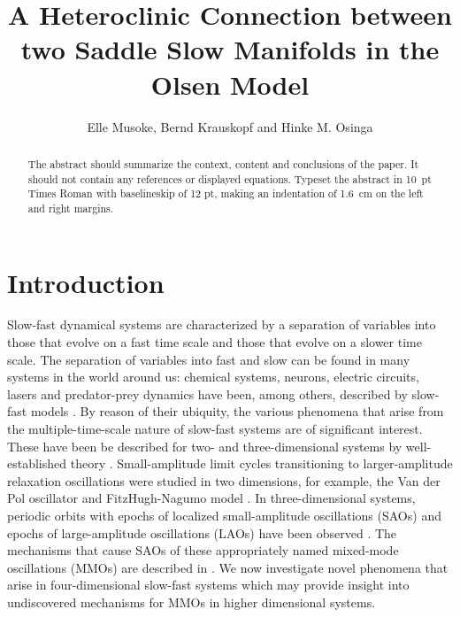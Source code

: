 \documentclass{ws-ijbc}
\begin{document}
\catchline{}{}{}{}{} %


\title{A Heteroclinic Connection between two Saddle Slow Manifolds in the Olsen Model}

\author{Elle Musoke, Bernd Krauskopf and Hinke M. Osinga}

\address{Department of Mathematics, University of Auckland, Private Bag 92019\\
Auckland, 1142, New Zealand\\
elle.musoke@auckland.ac.nz}

\maketitle

\begin{history}
\end{history}

\begin{abstract}
The abstract should summarize the context, content and conclusions
of the paper. It should not contain any references or displayed
equations. Typeset the abstract in 10~pt Times Roman with
baselineskip of 12 pt, making an indentation of 1.6~cm on the left
and right margins.
\end{abstract}

\section{Introduction}

Slow-fast dynamical systems are characterized by a separation of variables into those that evolve on a fast time scale and those that evolve on a slower time scale.  The separation of variables into fast and slow can be found in many systems in the world around us: chemical systems, neurons, electric circuits, lasers and predator-prey dynamics have been, among others, described by slow-fast models  \cite{BZ_reaction, Neurons,Circuits, lasers, Predator-Prey}.  By reason of their ubiquity, the various phenomena that arise from the multiple-time-scale nature of slow-fast systems are of significant interest. These have been be described for two- and three-dimensional systems by well-established theory \cite{canard_explosion, lents-rapides, enlacement,singular_hopf, folded_node,three}.  Small-amplitude limit cycles transitioning to larger-amplitude relaxation oscillations were studied in two dimensions, for example, the Van der Pol oscillator and FitzHugh-Nagumo model \cite{canard_explosion, fitz-hugh-nagumo}.  In three-dimensional systems, periodic orbits with epochs of localized small-amplitude oscillations (SAOs) and epochs of large-amplitude oscillations (LAOs) have been observed \cite{BZ}.  The mechanisms that cause SAOs of these appropriately named mixed-mode oscillations (MMOs) are described in \cite{MMO}.  We now investigate novel phenomena that arise in four-dimensional slow-fast systems which may provide insight into undiscovered mechanisms for MMOs in higher dimensional systems.
\end{document}
